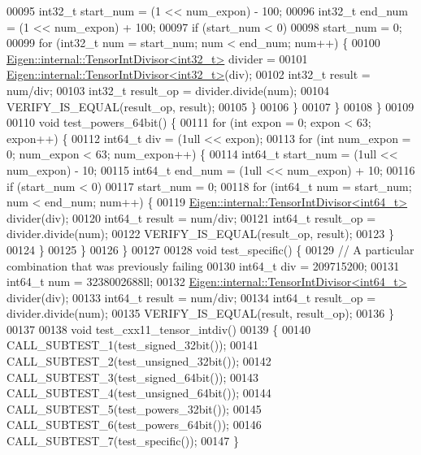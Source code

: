 \begin{DoxyCode}
00095       int32\_t start\_num = (1 << num\_expon) - 100;
00096       int32\_t end\_num = (1 << num\_expon) + 100;
00097       \textcolor{keywordflow}{if} (start\_num < 0)
00098         start\_num = 0;
00099       \textcolor{keywordflow}{for} (int32\_t num = start\_num; num < end\_num; num++) \{
00100         \hyperlink{struct_eigen_1_1internal_1_1_tensor_int_divisor}{Eigen::internal::TensorIntDivisor<int32\_t>} divider =
00101           \hyperlink{struct_eigen_1_1internal_1_1_tensor_int_divisor}{Eigen::internal::TensorIntDivisor<int32\_t>}(div);
00102         int32\_t result = num/div;
00103         int32\_t result\_op = divider.divide(num);
00104         VERIFY\_IS\_EQUAL(result\_op, result);
00105       \}
00106     \}
00107   \}
00108 \}
00109 
00110 \textcolor{keywordtype}{void} test\_powers\_64bit() \{
00111   \textcolor{keywordflow}{for} (\textcolor{keywordtype}{int} expon = 0; expon < 63; expon++) \{
00112     int64\_t div = (1ull << expon);
00113     \textcolor{keywordflow}{for} (\textcolor{keywordtype}{int} num\_expon = 0; num\_expon < 63; num\_expon++) \{
00114       int64\_t start\_num = (1ull << num\_expon) - 10;
00115       int64\_t end\_num = (1ull << num\_expon) + 10;
00116       \textcolor{keywordflow}{if} (start\_num < 0)
00117         start\_num = 0;
00118       \textcolor{keywordflow}{for} (int64\_t num = start\_num; num < end\_num; num++) \{
00119         \hyperlink{struct_eigen_1_1internal_1_1_tensor_int_divisor}{Eigen::internal::TensorIntDivisor<int64\_t>} divider(div);
00120         int64\_t result = num/div;
00121         int64\_t result\_op = divider.divide(num);
00122         VERIFY\_IS\_EQUAL(result\_op, result);
00123       \}
00124     \}
00125   \}
00126 \}
00127 
00128 \textcolor{keywordtype}{void} test\_specific() \{
00129   \textcolor{comment}{// A particular combination that was previously failing}
00130   int64\_t div = 209715200;
00131   int64\_t num = 3238002688ll;
00132   \hyperlink{struct_eigen_1_1internal_1_1_tensor_int_divisor}{Eigen::internal::TensorIntDivisor<int64\_t>} divider(div);
00133   int64\_t result = num/div;
00134   int64\_t result\_op = divider.divide(num);
00135   VERIFY\_IS\_EQUAL(result, result\_op);
00136 \}
00137 
00138 \textcolor{keywordtype}{void} test\_cxx11\_tensor\_intdiv()
00139 \{
00140   CALL\_SUBTEST\_1(test\_signed\_32bit());
00141   CALL\_SUBTEST\_2(test\_unsigned\_32bit());
00142   CALL\_SUBTEST\_3(test\_signed\_64bit());
00143   CALL\_SUBTEST\_4(test\_unsigned\_64bit());
00144   CALL\_SUBTEST\_5(test\_powers\_32bit());
00145   CALL\_SUBTEST\_6(test\_powers\_64bit());
00146   CALL\_SUBTEST\_7(test\_specific());
00147 \}
\end{DoxyCode}
